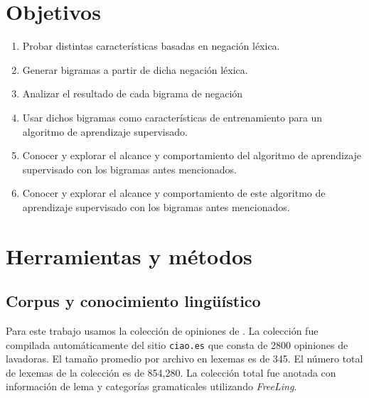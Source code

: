 \documentclass[a0,portrait]{a0poster}
\begin{document}
\begin{multicols}{2}
\color{DarkSlateGray} %

\section*{Objetivos}

\begin{enumerate}
\item Probar distintas características basadas en negación léxica.

\item Generar bigramas a partir de dicha negación léxica.

\item Analizar el resultado de cada bigrama de negación

\item Usar dichos bigramas como características de entrenamiento para un algoritmo de aprendizaje supervisado.

\item Conocer y explorar el alcance y comportamiento del algoritmo de aprendizaje supervisado con los bigramas antes mencionados.


\item Conocer y explorar el alcance y comportamiento de este algoritmo de aprendizaje supervisado con los bigramas antes mencionados.


\end{enumerate}


\section*{Herramientas y métodos}

\subsection*{Corpus y conocimiento lingüístico}

Para este trabajo usamos la colección de opiniones de \cite{galicia2014extraction}. La colección fue compilada automáticamente del sitio \texttt{ciao.es} que consta de 2800 opiniones de lavadoras. El tamaño promedio por archivo en lexemas es de 345. El número total de lexemas de la colección es de 854,280. La colección total fue anotada con información de lema y categorías gramaticales utilizando \textit{FreeLing}. 


\end{multicols}
\end{document}
